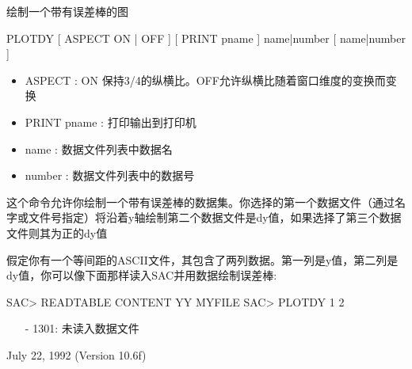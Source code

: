 \label{cmd:plotdy}

绘制一个带有误差棒的图

PLOTDY [ ASPECT ON | OFF ] [ PRINT pname ] name|number [ name|number ]

\begin{itemize}
\item ASPECT  : ON 保持3/4的纵横比。OFF允许纵横比随着窗口维度的变换而变换 
\item PRINT {pname} : 打印输出到打印机 
\item name : 数据文件列表中数据名 
\item number : 数据文件列表中的数据号 
\end{itemize}

这个命令允许你绘制一个带有误差棒的数据集。你选择的第一个数据文件（通过名字或文件号指定）将沿着y轴绘制第二个数据文件是dy值，如果选择了第三个数据文件则其为正的dy值

假定你有一个等间距的ASCII文件，其包含了两列数据。第一列是y值，第二列是dy值，你可以像下面那样读入SAC并用数据绘制误差棒:
\begin{SACCode}
SAC> READTABLE CONTENT YY MYFILE
SAC> PLOTDY 1 2
\end{SACCode}

\begin{itemize}
\item[-]1301: 未读入数据文件
\end{itemize}

July 22, 1992 (Version 10.6f)
